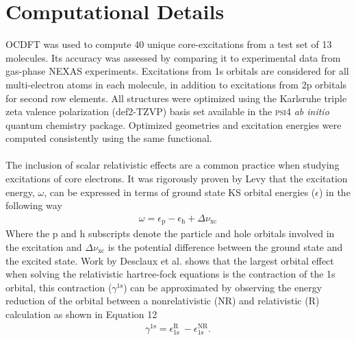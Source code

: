 \documentclass[12pt]{article}
\begin{document}
\section{Computational Details}
OCDFT was used to compute 40 unique core-excitations from a test set of 13 molecules. Its accuracy was assessed by comparing it to experimental data from gas-phase NEXAS experiments.\cite{puttner_vibrationally_1999,remmers_high-resolution_1992,chen_k-shell_1989,tronc_nitrogen_1980,tronc_carbon_1979,francis_studies_1994,adachi_vibronic_1999,hitchcock_k-shell_1979,domke_carbon_1990,nayandin_angle-resolved_2001,bodeur_single-and_1990} Excitations from 1s orbitals are considered for all multi-electron atoms in each molecule, in addition to excitations from 2p orbitals for second row elements. All structures were optimized using the Karlsruhe triple zeta valence polarization (def2-TZVP) basis set\cite{weigend_balanced_2005,weigend_accurate_2006} available in the \textsc{psi4} \textit{ab initio} quantum chemistry package.\cite{turney_psi4:_2012} Optimized geometries and excitation energies were computed consistently using the same functional.
\\ \\
The inclusion of scalar relativistic effects are a common practice when studying excitations of core electrons.\cite{maganas_l-edge_2014,debeer_george_calibration_2010,bauer_herfd-xas_2014,ankudinov_sensitivity_2002} It was rigorously proven by Levy \cite{levy_excitation_1995} that the excitation energy, $\omega$, can be expressed in terms of ground state KS orbital energies ($\epsilon$) in the following way
\begin{align}
\omega = \epsilon_{\text{p}} - \epsilon_{\text{h}} + \Delta \nu_{\text{xc}} 
\end{align}
Where the p and h subscripts denote the particle and hole orbitals involved in the excitation and $\Delta \nu_{\text{xc}} $ is the potential difference between the ground state and the excited state. Work by Desclaux et al. \cite{desclaux_relativistic_1971} shows that the largest orbital effect when solving the relativistic hartree-fock equations is the contraction of the 1s orbital, this contraction ($\gamma^{\text{1s}}$) can be approximated by observing the energy reduction of the orbital between a nonrelativistic (NR) and relativistic (R) calculation as shown in Equation 12
\begin{align}
\gamma^{\text{1s}} = \epsilon_{\text{1s}}^{\text{R}} \  - \epsilon_{\text{1s}}^{\text{NR}}.
\end{align}
\end{document}
